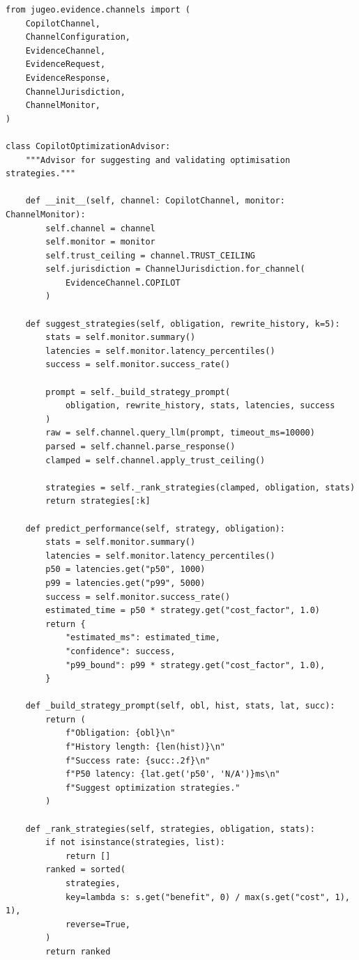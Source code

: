 \documentclass[11pt]{article}
\begin{document}
\begin{lstlisting}[style=jugeo-python,
  caption={Optimisation strategy suggestion via CopilotChannel},
  label={lst:optstrat}]
from jugeo.evidence.channels import (
    CopilotChannel,
    ChannelConfiguration,
    EvidenceChannel,
    EvidenceRequest,
    EvidenceResponse,
    ChannelJurisdiction,
    ChannelMonitor,
)

class CopilotOptimizationAdvisor:
    """Advisor for suggesting and validating optimisation strategies."""

    def __init__(self, channel: CopilotChannel, monitor: ChannelMonitor):
        self.channel = channel
        self.monitor = monitor
        self.trust_ceiling = channel.TRUST_CEILING
        self.jurisdiction = ChannelJurisdiction.for_channel(
            EvidenceChannel.COPILOT
        )

    def suggest_strategies(self, obligation, rewrite_history, k=5):
        stats = self.monitor.summary()
        latencies = self.monitor.latency_percentiles()
        success = self.monitor.success_rate()

        prompt = self._build_strategy_prompt(
            obligation, rewrite_history, stats, latencies, success
        )
        raw = self.channel.query_llm(prompt, timeout_ms=10000)
        parsed = self.channel.parse_response()
        clamped = self.channel.apply_trust_ceiling()

        strategies = self._rank_strategies(clamped, obligation, stats)
        return strategies[:k]

    def predict_performance(self, strategy, obligation):
        stats = self.monitor.summary()
        latencies = self.monitor.latency_percentiles()
        p50 = latencies.get("p50", 1000)
        p99 = latencies.get("p99", 5000)
        success = self.monitor.success_rate()
        estimated_time = p50 * strategy.get("cost_factor", 1.0)
        return {
            "estimated_ms": estimated_time,
            "confidence": success,
            "p99_bound": p99 * strategy.get("cost_factor", 1.0),
        }

    def _build_strategy_prompt(self, obl, hist, stats, lat, succ):
        return (
            f"Obligation: {obl}\n"
            f"History length: {len(hist)}\n"
            f"Success rate: {succ:.2f}\n"
            f"P50 latency: {lat.get('p50', 'N/A')}ms\n"
            f"Suggest optimization strategies."
        )

    def _rank_strategies(self, strategies, obligation, stats):
        if not isinstance(strategies, list):
            return []
        ranked = sorted(
            strategies,
            key=lambda s: s.get("benefit", 0) / max(s.get("cost", 1), 1),
            reverse=True,
        )
        return ranked
\end{lstlisting}
\end{document}
